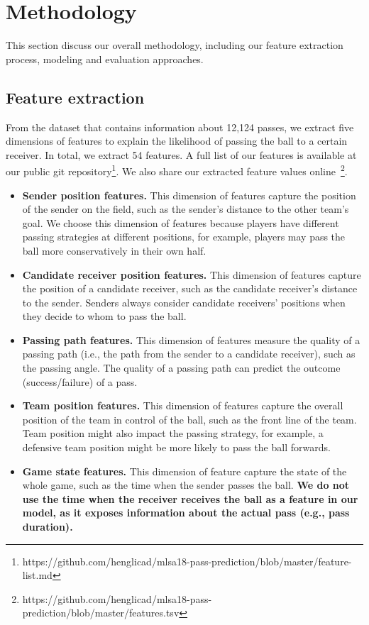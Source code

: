 \section{Methodology} \label{methodology}
This section discuss our overall methodology, including our feature extraction process, modeling and evaluation approaches.

\subsection{Feature extraction}

From the dataset that contains information about 12,124 passes\footnotemark[\ref{origin_dataset}], we extract five dimensions of features to explain the likelihood of passing the ball to a certain receiver. In total, we extract 54 features. A full list of our features is available at our public git repository\footnote{\label{feature-list}https://github.com/henglicad/mlsa18-pass-prediction/blob/master/feature-list.md}. 
We also share our extracted feature values online~\footnote{\label{feature-values}https://github.com/henglicad/mlsa18-pass-prediction/blob/master/features.tsv}.
\begin{itemize}
	\item \textbf{Sender position features.} This dimension of features capture the position of the sender on the field, such as the sender's distance to the other team's goal. We choose this dimension of features because players have different passing strategies at different positions, for example, players may pass the ball more conservatively in their own half. %
	\item \textbf{Candidate receiver position features.} This dimension of features capture the position of a candidate receiver, such as the candidate receiver's distance to the sender. Senders always consider candidate receivers' positions when they decide to whom to pass the ball.
	\item \textbf{Passing path features.} This dimension of features measure the quality of a passing path (i.e., the path from the sender to a candidate receiver), such as the passing angle. The quality of a passing path can predict the outcome (success/failure) of a pass.
	\item \textbf{Team position features.} This dimension of features capture the overall position of the team in control of the ball, such as the front line of the team. Team position might also impact the passing strategy, for example, a defensive team position might be more likely to pass the ball forwards.
	\item \textbf{Game state features.} This dimension of feature capture the state of the whole game, such as the time when the sender passes the ball. \textbf{We do not use the time when the receiver receives the ball as a feature in our model, as it exposes information about the actual pass (e.g., pass duration).}
\end{itemize}


